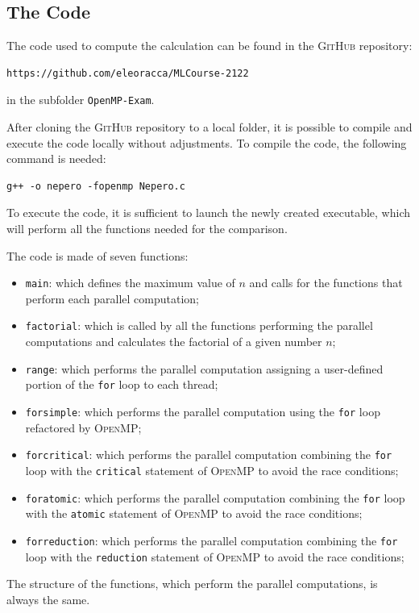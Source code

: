 \documentclass[11pt,a4paper]{article}
\begin{document}
\subsection{The Code}
\par The code used to compute the calculation can be found in the \textsc{GitHub} repository:
\begin{verbatim}
https://github.com/eleoracca/MLCourse-2122
\end{verbatim}
in the subfolder \verb+OpenMP-Exam+.
\par After cloning the \textsc{GitHub} repository to a local folder, it is possible to compile and execute the code locally without adjustments.
To compile the code, the following command is needed:
\begin{verbatim}
g++ -o nepero -fopenmp Nepero.c
\end{verbatim}
To execute the code, it is sufficient to launch the newly created executable, which will perform all the functions needed for the comparison.
\par The code is made of seven functions:
\begin{itemize}
	\item \verb+main+: which defines the maximum value of $n$ and calls for the functions that perform each parallel computation;
	\item \verb+factorial+: which is called by all the functions performing the parallel computations and calculates the factorial of a given number $n$;
	\item \verb+range+: which performs the parallel computation assigning a user-defined portion of the \verb+for+ loop to each thread;
	\item \verb+forsimple+: which performs the parallel computation using the \verb+for+ loop refactored by \textsc{OpenMP};
	\item \verb+forcritical+: which performs the parallel computation combining the \verb+for+ loop with the \verb+critical+ statement of \textsc{OpenMP} to avoid the race conditions;
	\item \verb+foratomic+: which performs the parallel computation combining the \verb+for+ loop with the \verb+atomic+ statement of \textsc{OpenMP} to avoid the race conditions;
	\item \verb+forreduction+: which performs the parallel computation combining the \verb+for+ loop with the \verb+reduction+ statement of \textsc{OpenMP} to avoid the race conditions;
\end{itemize}
\par The structure of the functions, which perform the parallel computations, is always the same.\\
\end{document}
